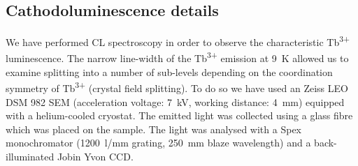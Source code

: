 \documentclass[%
aip,
rsi,%
 amsmath,amssymb,%
 reprint,%
]{revtex4-1}
\begin{document}
\subsection{Cathodoluminescence details}
\label{sec:CL}
We have performed CL spectroscopy in order to observe the characteristic Tb\textsuperscript{3+} luminescence. The narrow line-width of the Tb\textsuperscript{3+} emission at 9~K allowed us to examine splitting into a number of sub-levels depending on the coordination symmetry of Tb\textsuperscript{3+} (crystal field splitting). To do so we have used an Zeiss LEO DSM 982 SEM \cite{Schirra2007} (acceleration voltage: 7~kV,  working distance: 4~mm) equipped with a helium-cooled cryostat. The emitted light was collected using a glass fibre which was placed on the sample. The light was analysed with a Spex monochromator (1200~l/mm grating, 250~mm blaze wavelength) and a back-illuminated Jobin Yvon CCD.
\end{document}

